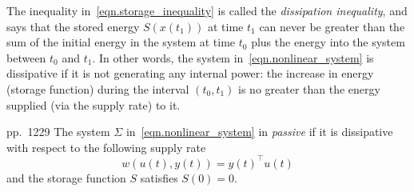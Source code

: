 The inequality in~\eqref{eqn.storage_inequality} is called the \textit{dissipation inequality}, and says that the stored energy $S(x(t_{1}))$ at time $t_{1}$ can never be greater than the sum of the initial energy in the system at time $t_{0}$ plus the energy into the system between $t_{0}$ and $t_{1}$.
In other words, the system in~\eqref{eqn.nonlinear_system} is dissipative if it is not generating any internal power: the increase in energy (storage function) during the interval $(t_{0},t_{1})$ is no greater than the energy supplied (via the supply rate) to it.


\begin{defn-dan}\cite{byrnes.passivitiy.1991}
  pp.~1229\label{defn.passive}
  The system $\Sigma$ in~\eqref{eqn.nonlinear_system} in \textit{passive} if it is dissipative with respect to the following supply rate
  \begin{equation}
    w(u(t),y(t))=y(t)^{\top}u(t)
  \end{equation}
  and the storage function $S$ satisfies $S(0)=0$.
\end{defn-dan}


%

